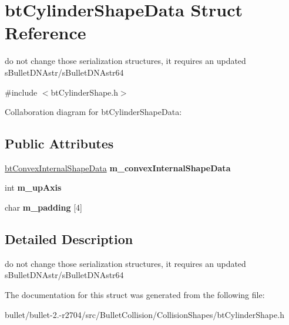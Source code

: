 \hypertarget{structbt_cylinder_shape_data}{\section{bt\+Cylinder\+Shape\+Data Struct Reference}
\label{structbt_cylinder_shape_data}
}


do not change those serialization structures, it requires an updated s\+Bullet\+D\+N\+Astr/s\+Bullet\+D\+N\+Astr64  




{\ttfamily \#include $<$bt\+Cylinder\+Shape.\+h$>$}



Collaboration diagram for bt\+Cylinder\+Shape\+Data\+:
\subsection*{Public Attributes}
\begin{DoxyCompactItemize}
\item 
\hypertarget{structbt_cylinder_shape_data_a28c7c43a31f7765ab3e3003957030161}{\hyperlink{structbt_convex_internal_shape_data}{bt\+Convex\+Internal\+Shape\+Data} {\bfseries m\+\_\+convex\+Internal\+Shape\+Data}}\label{structbt_cylinder_shape_data_a28c7c43a31f7765ab3e3003957030161}

\item 
\hypertarget{structbt_cylinder_shape_data_a9dcfe1386ff3853ae29c67c44178a2ac}{int {\bfseries m\+\_\+up\+Axis}}\label{structbt_cylinder_shape_data_a9dcfe1386ff3853ae29c67c44178a2ac}

\item 
\hypertarget{structbt_cylinder_shape_data_a7f86a6a2ab3810dc5c7b23d7aaf45f3c}{char {\bfseries m\+\_\+padding} \mbox{[}4\mbox{]}}\label{structbt_cylinder_shape_data_a7f86a6a2ab3810dc5c7b23d7aaf45f3c}

\end{DoxyCompactItemize}


\subsection{Detailed Description}
do not change those serialization structures, it requires an updated s\+Bullet\+D\+N\+Astr/s\+Bullet\+D\+N\+Astr64 

The documentation for this struct was generated from the following file\+:\begin{DoxyCompactItemize}
\item 
bullet/bullet-\/2.-\/r2704/src/\+Bullet\+Collision/\+Collision\+Shapes/bt\+Cylinder\+Shape.\+h\end{DoxyCompactItemize}
